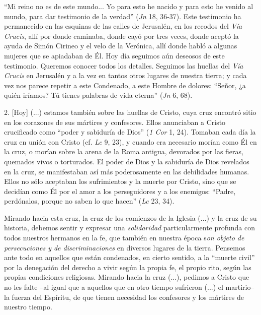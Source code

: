 			\begin{body}“Mi reino no es de este mundo... Yo para esto he nacido y para esto he venido al mundo, para dar testimonio de la verdad” (\textit{Jn }18, 36-37). Este testimonio ha permanecido en las esquinas de las calles de Jerusalén, en los recodos del \textit{Vía Crucis}, allí por donde caminaba, donde cayó por tres veces, donde aceptó la ayuda de Simón Cirineo y el velo de la Verónica, allí donde habló a algunas mujeres que se apiadaban de Él. Hoy día seguimos aún deseosos de este testimonio. Queremos conocer todos los detalles. Seguimos las huellas del \textit{Vía Crucis} en Jerusalén y a la vez en tantos otros lugares de nuestra tierra; y cada vez nos parece repetir a este Condenado, a este Hombre de dolores: “Señor, ¿a quién iríamos? Tú tienes palabras de vida eterna” (\textit{Jn} 6, 68).\end{body}
			
			\begin{body}2. [Hoy] (...) estamos también sobre las huellas de Cristo, cuya cruz encontró sitio en los corazones de sus mártires y confesores. Ellos anunciaban a Cristo crucificado como “poder y sabiduría de Dios” (\textit{1 Cor} 1, 24). Tomaban cada día la cruz en unión con Cristo (cf. \textit{Lc} 9, 23), y cuando era necesario morían como Él en la cruz, o morían sobre la arena de la Roma antigua, devorados por las fieras, quemados vivos o torturados. El poder de Dios y la sabiduría de Dios revelados en la cruz, se manifestaban así más poderosamente en las debilidades humanas. Ellos no sólo aceptaban los sufrimientos y la muerte por Cristo, sino que se decidían como Él por el amor a los perseguidores y a los enemigos: “Padre, perdónalos, porque no saben lo que hacen” (\textit{Lc} 23, 34).\end{body}
			
			\begin{body}\begin{bodysmall}\end{bodysmall}\end{body}
			
			\begin{body}Mirando hacia esta cruz, la cruz de los comienzos de la Iglesia (...) y la cruz de su historia, debemos sentir y expresar una \textit{solidaridad} particularmente profunda con todos nuestros hermanos en la fe, que también en nuestra época s\textit{on objeto de persecuciones y de discriminaciones} en diversos lugares de la tierra. Pensemos ante todo en aquellos que están condenados, en cierto sentido, a la “muerte civil” por la denegación del derecho a vivir según la propia fe, el propio rito, según las propias condiciones religiosas. Mirando hacia la cruz (...), pedimos a Cristo que no les falte –al igual que a aquellos que en otro tiempo sufrieron (...) el martirio– la fuerza del Espíritu, de que tienen necesidad los confesores y los mártires de nuestro tiempo.\end{body}
			
